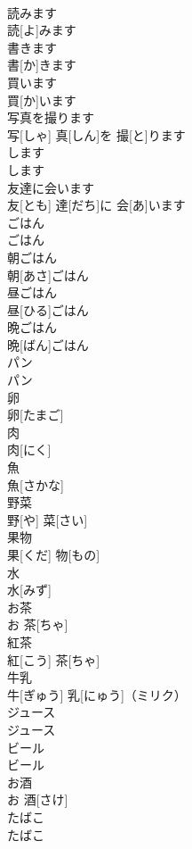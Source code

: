 \documentclass[8pt]{extreport}
\begin{document}
\begin{CJK}{UTF8}{min}
\\	読みます	
\\	読[よ]みます		
\\	書きます	
\\	書[か]きます		
\\	買います	
\\	買[か]います		
\\	写真を撮ります	
\\	写[しゃ] 真[しん]を 撮[と]ります		
\\	します	
\\	します		
\\	友達に会います	
\\	友[とも] 達[だち]に 会[あ]います		
\\	ごはん	
\\	ごはん		
\\	朝ごはん	
\\	朝[あさ]ごはん		
\\	昼ごはん	
\\	昼[ひる]ごはん		
\\	晩ごはん	
\\	晩[ばん]ごはん		
\\	パン	
\\	パン		
\\	卵	
\\	卵[たまご]		
\\	肉	
\\	肉[にく]		
\\	魚	
\\	魚[さかな]		
\\	野菜	
\\	野[や] 菜[さい]		
\\	果物	
\\	果[くだ] 物[もの]		
\\	水	
\\	水[みず]		
\\	お茶	
\\	お 茶[ちゃ]		
\\	紅茶	
\\	紅[こう] 茶[ちゃ]		
\\	牛乳	
\\	牛[ぎゅう] 乳[にゅう]（ミリク）		
\\	ジュース	
\\	ジュース		
\\	ビール	
\\	ビール		
\\	お酒	
\\	お 酒[さけ]		
\\	たばこ	
\\	たばこ		

\end{CJK}
\end{document}
